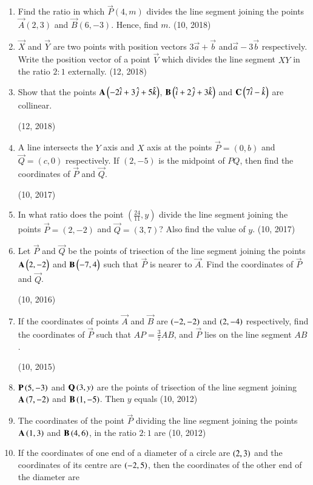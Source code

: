 \begin{enumerate}[label=\thesubsection.\arabic*,ref=\thesubsection.\theenumi]
    \item Find the ratio in which $\vec{P}(4,m)$ divides the line segment joining the points $\vec{A}(2,3)$ and $\vec{B}(6,-3)$. Hence, find $m$. \hfill (10, 2018)
\item $\vec{X}$ and $\vec{Y}$ are two points with position vectors $3\overrightarrow{a}+\overrightarrow{b}$ and$\overrightarrow{a}-3\overrightarrow{b}$ respectively. Write the position vector of a point $\vec{V}$ which divides the line segment $XY$ in the ratio $2:1$ externally.
\hfill (12, 2018) 
\item Show that the points $\mathbf{A}\left(-2\hat{i} + 3\hat{j} + 5\hat{k}\right)$, $\mathbf{B}\left(\hat{i} + 2\hat{j} + 3\hat{k}\right)$ and $\mathbf{C}\left(7\hat{i} -\hat{k} \right)$ are collinear.

\hfill (12, 2018) 
\item A line intersects the $Y$ axis and $X$ axis at the points $\vec{P} = (0, b)$ and $\vec{Q} = (c, 0)$ respectively. If $(2, -5)$ is the midpoint of $PQ$, then find the coordinates of $\vec{P}$ and $\vec{Q}$.

	\hfill (10, 2017)
\item In what ratio does the point $\left(\frac{24}{11}, y\right)$ divide the line segment joining the points $\vec{P} = (2, -2)$ and $\vec{Q} = (3, 7)$? Also find the value of $y$. \hfill (10, 2017)
    \item Let $\vec{P}$ and $\vec{Q}$ be the points of trisection of the line segment joining the points $\mathbf{A} \begin{pmatrix}2,-2\end{pmatrix}$ and $\mathbf{B} \begin{pmatrix}-7, 4\end{pmatrix}$ such that $\vec{P}$ is nearer to $\vec{A}$. Find the coordinates of $\vec{P}$ and $\vec{Q}$.
	    
	    \hfill (10, 2016)
    \item If the coordinates of points $\vec{A}$ and $\vec{B}$ are $\left(-2, -2\right)$ and $\left(2, -4\right)$ respectively, find the coordinates of $\vec{P}$ such that $AP = \frac{3}{7} AB$, and $\vec{P}$ lies on the line segment $AB$. 

		\hfill (10, 2015)
\item  $\mathbf{P}\left(5,-3\right)$ and $\mathbf{Q}\left(3,y\right)$ are the points of trisection of the line segment joining $\mathbf{A}\left(7,-2\right)$ and $\mathbf{B}\left(1,-5\right)$. Then $y$ equals
\hfill (10, 2012)
\item The coordinates of the point $\vec{P}$ dividing the line segment joining the points $\mathbf{A}\left(1,3\right)$ and $\mathbf{B}\left(4,6\right)$, in the ratio $2:1$ are
\hfill (10, 2012)
\item If the coordinates of one end of a diameter of a circle are $\left(2,3\right)$ and the coordinates of its centre are $\left(-2,5\right)$, then the coordinates of the other end of the diameter are


\end{enumerate}
